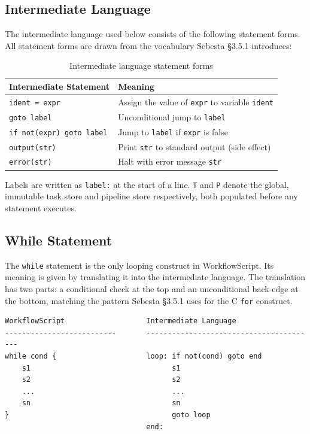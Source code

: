 \documentclass[10pt,a4paper]{article}
\begin{document}
\subsection{Intermediate Language}

The intermediate language used below consists of the following statement forms. All statement
forms are drawn from the vocabulary Sebesta \S3.5.1 introduces:

\begin{table}[h!]
\centering
\begin{tabular}{@{}ll@{}}
\toprule
\textbf{Intermediate Statement} & \textbf{Meaning} \\
\midrule
\texttt{ident = expr}            & Assign the value of \texttt{expr} to variable \texttt{ident} \\
\texttt{goto label}              & Unconditional jump to \texttt{label} \\
\texttt{if not(expr) goto label} & Jump to \texttt{label} if \texttt{expr} is false \\
\texttt{output(str)}             & Print \texttt{str} to standard output (side effect) \\
\texttt{error(str)}              & Halt with error message \texttt{str} \\
\bottomrule
\end{tabular}
\caption{Intermediate language statement forms}
\end{table}

Labels are written as \texttt{label:} at the start of a line. \texttt{T} and \texttt{P}
denote the global, immutable task store and pipeline store respectively, both populated
before any statement executes.

\subsection{While Statement}

The \texttt{while} statement is the only looping construct in WorkflowScript. Its meaning is
given by translating it into the intermediate language. The translation has two parts: a
conditional check at the top and an unconditional back-edge at the bottom, matching the
pattern Sebesta \S3.5.1 uses for the C \texttt{for} construct.

\begin{lstlisting}[language={}, caption={While statement translation to intermediate language}]
WorkflowScript                   Intermediate Language
--------------------------       ----------------------------------------
while cond {                     loop: if not(cond) goto end
    s1                                 s1
    s2                                 s2
    ...                                ...
    sn                                 sn
}                                      goto loop
                                 end:
\end{lstlisting}
\end{document}
